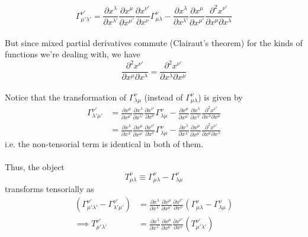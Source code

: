 \documentclass[11pt]{article}
\begin{document}
\[  \Gamma_{\mu' \lambda'}^{\nu'} = \frac{\partial x^{\lambda}}{\partial x^{\lambda'}} \frac{\partial x^{\mu}}{\partial x^{\mu'}} \frac{\partial x^{\nu'}}{\partial x^{\nu}} \Gamma_{\mu \lambda}^{\nu} - \frac{\partial x^{\lambda}}{\partial x^{\lambda'}} \frac{\partial x^{\mu}}{\partial x^{\mu'}} \frac{\partial^2 x^{\nu'}}{\partial x^{\mu} \partial x^{\lambda}}  \]
\\
But since mixed partial derivatives commute (Clairaut's theorem) for the kinds of functions we're dealing with, we have
\[ \frac{\partial^2 x^{\nu'}}{\partial x^{\mu} \partial x^{\lambda}} = \frac{\partial^2 x^{\nu'}}{\partial x^{\lambda} \partial x^{\mu}} \]
\\
Notice that the transformation of $\Gamma_{\lambda \mu}^{\nu}$ (instead of $\Gamma_{\mu \lambda}^{\nu}$) is given by 
\begin{align*}
  \Gamma_{\lambda' \mu'}^{\nu'} &= \frac{\partial x^{\mu}}{\partial x^{\mu'}} \frac{\partial x^{\lambda}}{\partial x^{\lambda'}} \frac{\partial x^{\nu'}}{\partial x^{\nu}} \Gamma_{\lambda \mu}^{\nu} - \frac{\partial x^{\mu}}{\partial x^{\mu'}} \frac{\partial x^{\lambda}}{\partial x^{\lambda'}}  \frac{\partial^2 x^{\nu'}}{\partial x^{\lambda} \partial x^{\mu}} \\
  &= \frac{\partial x^{\lambda}}{\partial x^{\lambda'}} \frac{\partial x^{\mu}}{\partial x^{\mu'}} \frac{\partial x^{\nu'}}{\partial x^{\nu}} \Gamma_{\lambda \mu}^{\nu} - \frac{\partial x^{\lambda}}{\partial x^{\lambda'}} \frac{\partial x^{\mu}}{\partial x^{\mu'}} \frac{\partial^2 x^{\nu'}}{\partial x^{\mu} \partial x^{\lambda}}
\end{align*}
i.e. the non-tensorial term is identical in both of them.
\\
\\
Thus, the object  
\[ T_{\mu \lambda}^{\nu} \equiv \Gamma_{\mu \lambda}^{\nu} - \Gamma_{\lambda \mu}^{\nu} \]
transforms tensorially as 
\begin{align*}
  \left( \Gamma_{\mu' \lambda'}^{\nu'} - \Gamma_{\lambda' \mu'}^{\nu'} \right) &= \frac{\partial x^{\lambda}}{\partial x^{\lambda'}} \frac{\partial x^{\mu}}{\partial x^{\mu'}} \frac{\partial x^{\nu'}}{\partial x^{\nu}} \left( \Gamma_{\mu \lambda}^{\nu} - \Gamma_{\lambda \mu}^{\nu} \right) \\
  \implies T_{\mu' \lambda'}^{\nu'} &=  \frac{\partial x^{\lambda}}{\partial x^{\lambda'}} \frac{\partial x^{\mu}}{\partial x^{\mu'}} \frac{\partial x^{\nu'}}{\partial x^{\nu}} \left( T_{\mu' \lambda'}^{\nu'} \right)
\end{align*}
\end{document}
